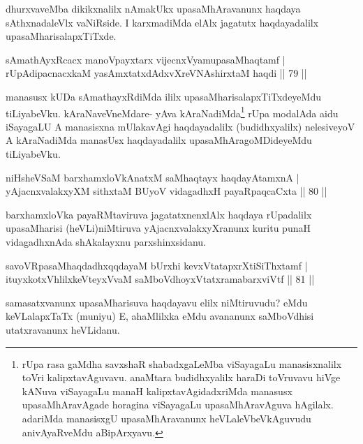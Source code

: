 \begin{artha}
dhurxvaveMba dikikxnalilx nAmakUkx upasaMhAravanunx haqdaya sAthxnadaleVlx vaNiRside. I karxmadiMda elAlx jagatutx haqdayadalilx upasaMharisalapxTiTxde.
\end{artha}


\begin{shl}
sAmathAyxRcacx manoV\s payxtarx vijecnxVyamupasaMhaqtamf |\\
rUpAdipacnacxkaM yasAmxtatxdAdxvXreVNA\s \s shirxtaM haqdi \hfill || 79 ||
\end{shl}

\begin{artha}
manasusx kUDa sAmathayxRdiMda ililx upasaMharisalapxTiTxdeyeMdu tiLiyabeVku. kAraNaveVneMdare- yAva kAraNadiMda\footnote[2]{rUpa rasa gaMdha savxshaR shabadxgaLeMba viSayagaLu manasisxnalilx toVri kalipxtavAguvavu. anaMtara budidhxyalilx haraDi toVruvavu hiVge kANuva viSayagaLu manaH kalipxtavAgidadxriMda manasusx upasaMhAravAgade horagina viSayagaLu upasaMhAravAguva hAgilalx. adariMda manasisxgU upasaMhAravanunx heVLaleVbeVkAguvudu anivAyaRveMdu aBipArxyavu.} rUpa modalAda aidu iSayagaLU A manasisxna mUlakavAgi haqdayadalilx (budidhxyalilx) nelesiveyoV A kAraNadiMda manasUsx haqdayadalilx upasaMhAragoMDideyeMdu tiLiyabeVku.
\end{artha}%

\begin{shl}
niHsheVSaM barxhamxloVkAnatxM saMhaqtayx haqdayAtamxnA |\\
yAjacnxvalakxyXM sithxtaM BUyoV vidagadhxH payaRpaqcaCxta \hfill || 80 ||
\end{shl}

\begin{artha}
barxhamxloVka payaRMtaviruva jagatatxnenxlAlx haqdaya rUpadalilx upasaMharisi (heVLi)niMtiruva yAjacnxvalakxyXranunx kuritu punaH vidagadhxnAda shAkalayxnu parxshinxsidanu.
\end{artha}

\begin{shl}
savoVRpasaMhaqdadhxqqdayaM bUrxhi kevxVtatapxrXtiSiThxtamf |\\
ituyxkotxV\s hlilxkeVteyxVvaM saMboVdhoyxVtatxramabarxviVtf \hfill || 81 ||
\end{shl}

\begin{artha}
samasatxvanunx upasaMharisuva haqdayavu elilx niMtiruvudu? eMdu keVLalapxTaTx (muniyu) E, ahaMlilxka eMdu avananunx saMboVdhisi utatxravanunx heVLidanu.
\end{artha}

